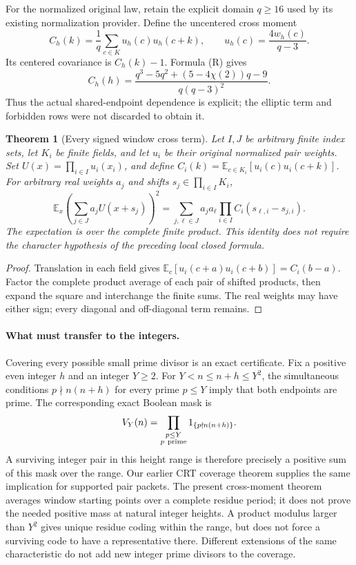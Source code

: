 \documentclass[11pt]{article}
\newtheorem{theorem}{Theorem}[section]
\begin{document}
For the normalized original law, retain the explicit domain \(q\ge16\)
used by its existing normalization provider. Define the uncentered
cross moment
\[
 C_h(k)=\frac1q\sum_{c\in K}u_h(c)u_h(c+k),
 \qquad u_h(c)=\frac{4w_h(c)}{q-3}.
\]
Its centered covariance is \(C_h(k)-1\). Formula (R) gives
\[
 C_h(h)=
 \frac{q^3-5q^2+(5-4\chi(2))q-9}{q(q-3)^2}.
\]
Thus the actual shared-endpoint dependence is explicit; the elliptic
term and forbidden rows were not discarded to obtain it.

\begin{theorem}[Every signed window cross term]
Let \(I,J\) be arbitrary finite index sets, let \(K_i\) be finite fields,
and let \(u_i\) be their original normalized pair weights.
Set \(U(x)=\prod_{i\in I}u_i(x_i)\), and define
\(C_i(k)=\mathbb E_{c\in K_i}[u_i(c)u_i(c+k)]\).
For arbitrary real weights \(a_j\) and shifts
\(s_j\in\prod_{i\in I}K_i\),
\[
 \mathbb E_x\left(\sum_{j\in J}a_jU(x+s_j)\right)^2
 =\sum_{j,\ell\in J}a_ja_\ell
       \prod_{i\in I}C_i(s_{\ell,i}-s_{j,i}).
\]
The expectation is over the complete finite product. This identity does
not require the character hypothesis of the preceding local closed formula.
\end{theorem}

\begin{proof}
Translation in each field gives
\(\mathbb E_c[u_i(c+a)u_i(c+b)]=C_i(b-a)\).
Factor the complete product average of each pair of shifted products,
then expand the square and interchange the finite sums. The real
weights may have either sign; every diagonal and off-diagonal term remains.
\end{proof}

\paragraph{What must transfer to the integers.}
Covering every possible small prime divisor is an exact certificate.
Fix a positive even integer \(h\) and an integer \(Y\ge2\).
For \(Y<n\le n+h\le Y^2\), the simultaneous conditions
\(p\nmid n(n+h)\) for every prime \(p\le Y\) imply that both endpoints
are prime. The corresponding exact Boolean mask is
\[
 V_Y(n)=\prod_{\substack{p\le Y\\p\ {\rm prime}}}
                    1_{\{p\nmid n(n+h)\}}.
\]
A surviving integer pair in this height range is therefore precisely
a positive sum of this mask over the range. Our earlier CRT coverage
theorem supplies the same implication for supported pair packets.
The present cross-moment theorem averages window starting points over
a complete residue period; it does not prove the needed positive mass
at natural integer heights. A product modulus larger than \(Y^2\)
gives unique residue coding within the range, but does not force a
surviving code to have a representative there. Different extensions
of the same characteristic do not add new integer prime divisors to
the coverage.
\end{document}
